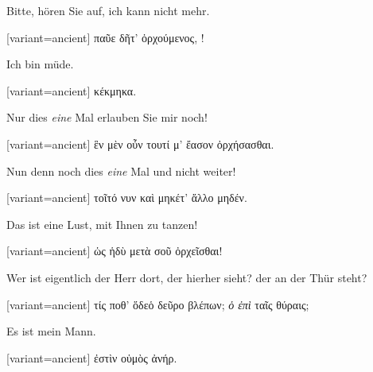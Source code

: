 Bitte, hören Sie auf, ich kann nicht mehr. 

\switchcolumn

\begin{greek}[variant=ancient]%
παῦε δῆτ' ὀρχούμενος, !

\end{greek}%
\switchcolumn*

Ich bin müde. 

\switchcolumn

\begin{greek}[variant=ancient]%
κέκμηκα.

\end{greek}%
\switchcolumn*

Nur dies \emph{eine} Mal erlauben Sie mir noch!

\switchcolumn

\begin{greek}[variant=ancient]%
ἓν μὲν οὖν τουτί μ' ἔασον ὀρχήσασθαι.

\end{greek}%
\switchcolumn*

Nun denn noch dies \emph{eine} Mal und nicht weiter! 

\switchcolumn

\begin{greek}[variant=ancient]%
τοῖτό νυν καὶ μηκέτ' ἄλλο μηδέν.

\end{greek}%
\switchcolumn*

Das ist eine Lust, mit Ihnen zu tanzen! 

\switchcolumn

\begin{greek}[variant=ancient]%
ὡς ἡδὺ μετὰ σοῦ ὀρχεῖσθαι!

\end{greek}%
\switchcolumn*

Wer ist eigentlich der Herr dort, der hierher sieht? der an der Thür
steht? 

\switchcolumn

\begin{greek}[variant=ancient]%
τίς ποθ' ὅδεὁ δεῦρο βλέπων; \emph{ὁ ἐπὶ} ταῖς θύραις;

\end{greek}%
\switchcolumn*

Es ist mein Mann. 

\switchcolumn

\begin{greek}[variant=ancient]%
ἐστὶν οὑμὸς ἀνήρ.

\end{greek}%
\switchcolumn*

